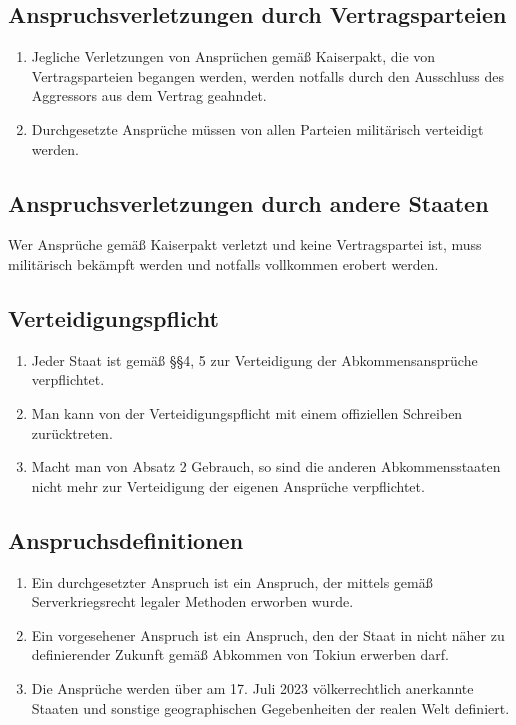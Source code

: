 \documentclass{article}
\begin{document}
\subsection{Anspruchsverletzungen durch Vertragsparteien}
\begin{enumerate}[(1)]
    \item Jegliche Verletzungen von Ansprüchen gemäß Kaiserpakt, die von Vertragsparteien begangen werden, werden notfalls durch den Ausschluss des Aggressors aus dem Vertrag geahndet.
    \item Durchgesetzte Ansprüche müssen von allen Parteien militärisch verteidigt werden.
\end{enumerate}

\subsection{Anspruchsverletzungen durch andere Staaten}
Wer Ansprüche gemäß Kaiserpakt verletzt und keine Vertragspartei ist, muss militärisch bekämpft werden und notfalls vollkommen erobert werden.

\subsection{Verteidigungspflicht}
\begin{enumerate}[(1)]
    \item Jeder Staat ist gemäß §§4, 5 zur Verteidigung der Abkommensansprüche verpflichtet.
    \item Man kann von der Verteidigungspflicht mit einem offiziellen Schreiben zurücktreten.
    \item Macht man von Absatz 2 Gebrauch, so sind die anderen Abkommensstaaten nicht mehr zur Verteidigung der eigenen Ansprüche verpflichtet.
\end{enumerate}

\subsection{Anspruchsdefinitionen}
\begin{enumerate}[(1)]
    \item Ein durchgesetzter Anspruch ist ein Anspruch, der mittels gemäß Serverkriegsrecht legaler Methoden erworben wurde.
    \item Ein vorgesehener Anspruch ist ein Anspruch, den der Staat in nicht näher zu definierender Zukunft gemäß Abkommen von Tokiun erwerben darf. 
    \item Die Ansprüche werden über am 17. Juli 2023 völkerrechtlich anerkannte Staaten und sonstige geographischen Gegebenheiten der realen Welt definiert.
\end{enumerate}
\end{document}
